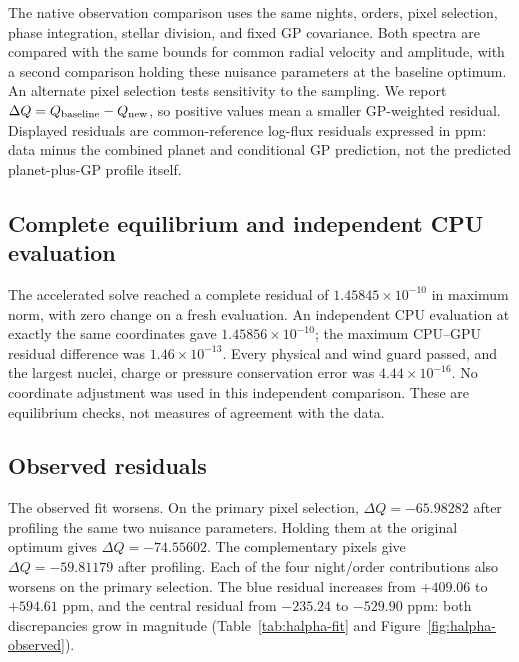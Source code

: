 The native observation comparison uses the same nights, orders, pixel
selection, phase integration, stellar division, and fixed GP covariance.
Both spectra are compared with the same bounds for common radial velocity
and amplitude, with a second comparison holding these nuisance parameters
at the baseline optimum. An alternate pixel selection tests sensitivity to
the sampling. We report $\Delta Q=Q_{\rm baseline}-Q_{\rm new}$, so positive
values mean a smaller GP-weighted residual. Displayed residuals are
common-reference log-flux residuals expressed in ppm: data minus the
combined planet and conditional GP prediction, not the predicted
planet-plus-GP profile itself.

\subsection{Complete equilibrium and independent CPU evaluation}
The accelerated solve reached a complete residual of
$1.45845\times10^{-10}$ in maximum norm, with zero change on a fresh
evaluation. An independent CPU evaluation at exactly the same coordinates
gave $1.45856\times10^{-10}$; the maximum CPU--GPU residual difference was
$1.46\times10^{-13}$. Every physical and wind guard passed, and the largest
nuclei, charge or pressure conservation error was $4.44\times10^{-16}$.
No coordinate adjustment was used in this independent comparison.
These are equilibrium checks, not measures of agreement with the data.

\subsection{Observed residuals}
The observed fit worsens. On the primary pixel selection,
$\Delta Q=-65.98282$ after profiling the same two nuisance parameters.
Holding them at the original optimum gives $\Delta Q=-74.55602$.
The complementary pixels give $\Delta Q=-59.81179$ after profiling.
Each of the four night/order contributions also worsens on the primary
selection. The blue residual increases from $+409.06$ to $+594.61$ ppm,
and the central residual from $-235.24$ to $-529.90$ ppm: both discrepancies
grow in magnitude (Table~\ref{tab:halpha-fit} and
Figure~\ref{fig:halpha-observed}).

